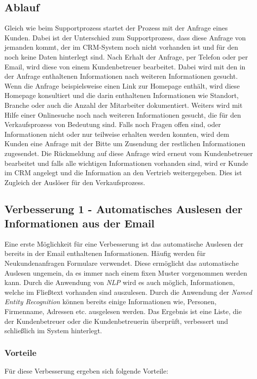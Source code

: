\subsection{Ablauf}
Gleich wie beim Supportprozess startet der Prozess mit der Anfrage eines Kunden. Dabei ist der Unterschied zum Supportprozess, dass diese Anfrage von jemanden kommt, der im CRM-System noch nicht vorhanden ist und für den noch keine Daten hinterlegt sind. Nach Erhalt der Anfrage, per Telefon oder per Email, wird diese von einem Kundenbetreuer bearbeitet. Dabei wird mit den in der Anfrage enthaltenen Informationen nach weiteren Informationen gesucht. Wenn die Anfrage beispielsweise einen Link zur Homepage enthält, wird diese Homepage konsultiert und die darin enthaltenen Informationen wie Standort, Branche oder auch die Anzahl der Mitarbeiter dokumentiert. Weiters wird mit Hilfe einer Onlinesuche noch nach weiteren Informationen gesucht, die für den Verkaufsprozess von Bedeutung sind. Falls noch Fragen offen sind, oder Informationen nicht oder nur teilweise erhalten werden konnten, wird dem Kunden eine Anfrage mit der Bitte um Zusendung der restlichen Informationen zugesendet. Die Rückmeldung auf diese Anfrage wird erneut vom Kundenbetreuer bearbeitet und falls alle wichtigen Informationen vorhanden sind, wird er Kunde im CRM angelegt und die Information an den Vertrieb weitergegeben. Dies ist Zugleich der Auslöser für den Verkaufsprozess.

\subsection{Verbesserung 1 - Automatisches Auslesen der Informationen aus der Email}
Eine erste Möglichkeit für eine Verbesserung ist das automatische Auslesen der bereits in der Email enthaltenen Informationen. Häufig werden für Neukundenanfragen Formulare verwendet. Diese ermöglicht das automatische Auslesen ungemein, da es immer nach einem fixen Muster vorgenommen werden kann. Durch die Anwendung von \textit{NLP} wird es auch möglich, Informationen, welche im Fließtext vorhanden sind auszulesen. Durch die Anwendung der \textit{Named Entity Recognition} können bereits einige Informationen wie, Personen, Firmenname, Adressen etc. ausgelesen werden. Das Ergebnis ist eine Liste, die der Kundenbetreuer oder die Kundenbetreuerin überprüft, verbessert und schließlich im System hinterlegt. 


\subsubsection{Vorteile}
Für diese Verbesserung ergeben sich folgende Vorteile:

